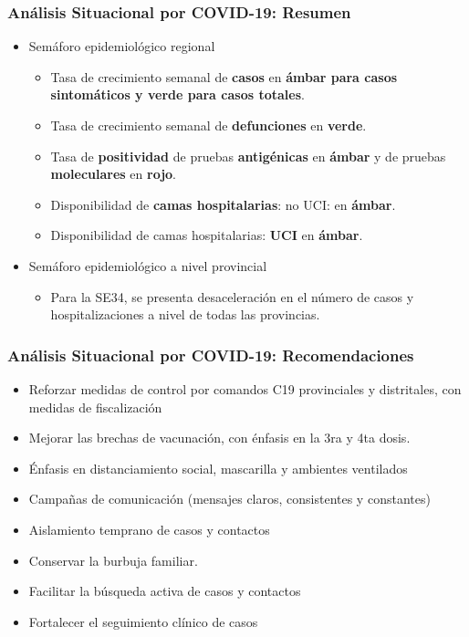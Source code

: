\documentclass[xcolor=table]{beamer}
\begin{document}
\begin{frame}
	\frametitle{Análisis Situacional por COVID-19: Resumen}
	\vspace{-.5cm}
	\begin{itemize}
		\item Semáforo epidemiológico regional
		\begin{itemize}
			\item Tasa de crecimiento semanal de \textbf{\color{mycolor4}casos} en \textbf{\color{mycolor3}ámbar para casos sintomáticos y verde para casos totales}.
			\item Tasa de crecimiento semanal de \textbf{\color{mycolor4}defunciones} en \textbf{\color{mycolor3}verde}.
			\item Tasa de \textbf{\color{mycolor4}positividad} de pruebas \textbf{\color{mycolor4}antigénicas} en \textbf{\color{mycolor3}ámbar} y de pruebas \textbf{\color{mycolor4}moleculares} en \textbf{\color{mycolor3}rojo}.
			\item Disponibilidad de \textbf{\color{mycolor4}camas hospitalarias}: no UCI: en \textbf{\color{mycolor3}ámbar}.
			\item Disponibilidad de camas hospitalarias: \textbf{\color{mycolor4}UCI} en \textbf{\color{mycolor3}ámbar}.
		\end{itemize} 
		\item Semáforo epidemiológico a nivel provincial
		\begin{itemize}
			\item Para la SE34, se presenta desaceleración en el número de casos y hospitalizaciones a nivel de todas las provincias.
		\end{itemize}
	\end{itemize}
\end{frame}

\begin{frame}[label=recomendaciones]
	\frametitle{Análisis Situacional por COVID-19: Recomendaciones}
	\vspace{-.5cm}
	\begin{itemize}
			\item Reforzar medidas de control por comandos C19 provinciales y distritales, con medidas de fiscalización
			\item Mejorar las brechas de vacunación, con énfasis en la 3ra y 4ta dosis.
			\item Énfasis en distanciamiento social, mascarilla y ambientes ventilados
			\item Campañas de comunicación (mensajes claros, consistentes y constantes)
			\item Aislamiento temprano de casos y contactos
			\item Conservar la burbuja familiar. 
			\item Facilitar la búsqueda activa de casos y contactos
			\item Fortalecer el seguimiento clínico de casos			
	\end{itemize} 
\end{frame}
\end{document}
